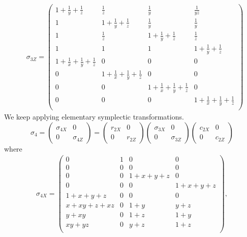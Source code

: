 \begin{align*}
 & \sigma_{3Z} =
\begin{pmatrix}
 1+\frac{1}{y}+\frac{1}{z} & \frac{1}{z} & \frac{1}{y} & \frac{1}{y z} \\
 1 & 1+\frac{1}{y}+\frac{1}{z} & \frac{1}{y} & \frac{1}{y} \\
 1 & \frac{1}{z} & 1+\frac{1}{y}+\frac{1}{z} & \frac{1}{z} \\
 1 & 1 & 1 & 1+\frac{1}{y}+\frac{1}{z} \\
 1+\frac{1}{x}+\frac{1}{y}+\frac{1}{z} & 0 & 0 & 0 \\
 0 & 1+\frac{1}{x}+\frac{1}{y}+\frac{1}{z} & 0 & 0 \\
 0 & 0 & 1+\frac{1}{x}+\frac{1}{y}+\frac{1}{z} & 0 \\
 0 & 0 & 0 & 1+\frac{1}{x}+\frac{1}{y}+\frac{1}{z} \\
\end{pmatrix}
\end{align*}
We keep applying elementary symplectic transformations.
\[
 \sigma_4 = \begin{pmatrix} \sigma_{4X} & 0 \\ 0 & \sigma_{4Z} \end{pmatrix}
=
\begin{pmatrix} r_{2X} & 0 \\ 0 & r_{2Z} \end{pmatrix}
\begin{pmatrix} \sigma_{3X} & 0 \\ 0 & \sigma_{3Z} \end{pmatrix}
\begin{pmatrix} c_{2X} & 0 \\ 0 & c_{2Z} \end{pmatrix}
\]
where
\begin{align*}
\sigma_{4X} = 
\left(\begin{array}{c|c|cc}
 0 & 1 & 0 & 0  \\
 0 & 0 & 0 & 0  \\
\hline
 0 & 0 & 1+x+y+z & 0  \\
 0 & 0 & 0 & 1+x+y+z  \\
 1+x+y+z & 0 & 0 & 0  \\
 x+x y+z+x z & 0 & 1+y & y+z \\
 y+x y & 0 & 1+z & 1+y       \\
 x y+y z & 0 & y+z & 1+z     \\
\end{array}\right),
\end{align*}
